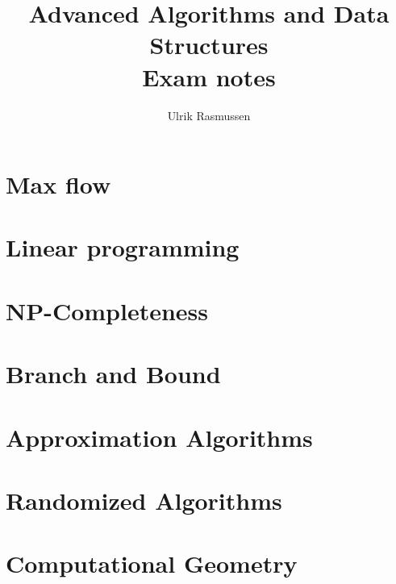\documentclass[a4paper, 10pt, oneside, article]{memoir}
\title{Advanced Algorithms and Data Structures\\Exam notes}
\author{Ulrik Rasmussen}
\begin{document}
\newcommand{\To}{{}\mathop{\mathbf{to}}{}}

\maketitle

\section{Max flow}


\newpage

\section{Linear programming}


\newpage

\section{NP-Completeness}


\newpage

\section{Branch and Bound}


\newpage

\section{Approximation Algorithms}


\newpage

\section{Randomized Algorithms}


\newpage

\section{Computational Geometry}


\end{document}
